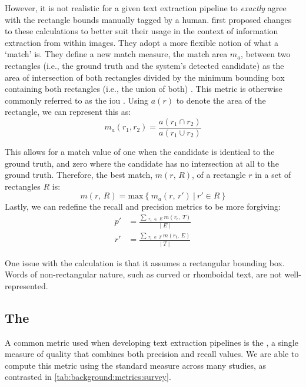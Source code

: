 However, it is not realistic for a given text extraction pipeline to \textit{exactly} agree with the rectangle bounds manually tagged by a human. \citet{Lucas:2003iw} first proposed changes to these calculations to better suit their usage in the context of information extraction from within images. They adopt a more flexible notion of what a `match' is. They define a new match measure, the match area $m_{a}$, between two rectangles (i.e., the ground truth and the system's detected candidate) as the area of intersection of both rectangles divided by the minimum bounding box containing both rectangles (i.e., the union of both) \citep{Lucas:2003iw, Lucas:2005bq, Lucas:2005hl}. This metric is otherwise commonly referred to as the \gls{iou} \citep{Karatzas:2015tj,Lin:2014vma,Jaderberg:2016wj}. Using $a(r)$ to denote the area of the rectangle, we can represent this as:
\begin{equation*}
  m_{a}(r_{1}, r_{2}) = \frac{a(r_{1} \cap r_{2})}{a(r_{1} \cup r_{2})}
\end{equation*}

This allows for a match value of one when the candidate is identical to the ground truth, and zero where the candidate has no intersection at all to the ground truth. Therefore, the best match, $m(r,\,R)$, of a rectangle $r$ in a set of rectangles $R$ is:
\begin{equation*}
  m(r,\,R) = \mathrm{max}~\{~m_{a}(r,\,r')~|~r' \in R~\}
\end{equation*}
\noindent
Lastly, we can redefine the recall and precision metrics to be more forgiving:
\begin{align*}
  p' &= \frac{\sum\,_{r_{e}\;\in\;E}~m(r_{e},\,T)}{\lvert\;E\;\rvert}\\
  r' &= \frac{\sum\,_{r_{t}\;\in\;T}~m(r_{t},\,E)}{\lvert\;T\;\rvert}
\end{align*}

One issue with the calculation is that it assumes a rectangular bounding box. Words of non-rectangular nature, such as curved or rhomboidal text, are not well-represented.

\subsection{The \fscore}
\label{sec:background:metrics:fscore}

A common metric used when developing text extraction pipelines is the \fscore, a single measure of quality that combines both precision and recall values. We are able to compute this metric using the standard measure across many studies, as contrasted in \cref{tab:background:metrics:survey}.

